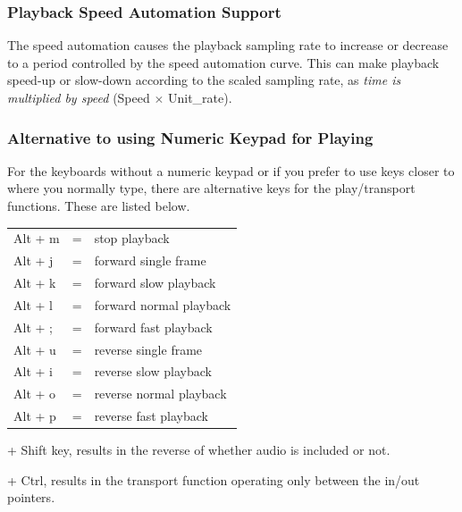 \subsubsection*{Playback Speed Automation Support}%
\label{ssub:playback_speed_automation_support}


The speed automation causes the playback sampling rate to increase or decrease to a period controlled by the speed automation curve.  
This can make playback speed-up or slow-down according to the scaled sampling rate, as \textit{time is multiplied by speed} (Speed $\times$ Unit\_rate).

\subsubsection*{Alternative to using Numeric Keypad for Playing}%
\label{ssub:alternative_to_using_numeric_keypad_for_playing}


For the keyboards without a numeric keypad or if you prefer to use keys closer to where you normally type, there are alternative keys for the play/transport functions.  These are listed below.

\begin{tabular}{lcl}
	Alt + m&=&stop playback\\

	Alt + j&=&forward single frame\\

	Alt + k&=&forward slow playback\\

	Alt + l&=&forward normal playback\\

	Alt + ;&=&forward fast playback\\

	Alt + u&=&reverse single frame\\

	Alt + i&=&reverse slow playback\\

	Alt + o&=&reverse normal playback\\

	Alt + p&=&reverse fast playback\\
\end{tabular}
\begin{minipage}{.45\linewidth}
+ Shift key, results in the reverse of whether audio is included or not.
\vspace{1ex}

+ Ctrl, results in the transport function operating only between the in/out pointers.
\end{minipage}

